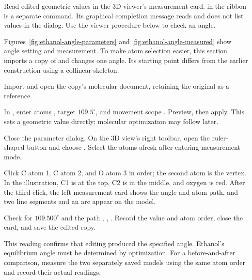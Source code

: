 Read edited geometric values in the 3D viewer's measurement card.  in the ribbon is a separate command. Its graphical completion message reads  and does not list values in the dialog. Use the viewer procedure below to check an angle.

Figures~\ref{fig:ethanol-angle-parameters} and \ref{fig:ethanol-angle-measured} show angle setting and measurement. To make atom selection easier, this section imports a copy of \mbox{} and changes one angle. Its starting point differs from the earlier construction using a collinear skeleton.

\begin{steps}
  \item Import \mbox{} and open the copy's molecular document, retaining the original as a reference.
  \item In , enter atoms , target $109.5^\circ$, and movement scope . Preview, then apply. This sets a geometric value directly; molecular optimization may follow later.
\end{steps}



\begin{steps}[resume]
  \item Close the parameter dialog. On the 3D view's right toolbar, open the ruler-shaped  button and choose . Select the atoms afresh after entering measurement mode.
  \item Click C atom 1, C atom 2, and O atom 3 in order; the second atom is the vertex. In the illustration, C1 is at the top, C2 is in the middle, and oxygen is red. After the third click, the left measurement card shows the angle and atom path, and two line segments and an arc appear on the model.
  \item Check for $109.500^\circ$ and the path , , . Record the value and atom order, close the card, and save the edited copy.
\end{steps}

This reading confirms that editing produced the specified angle. Ethanol's equilibrium angle must be determined by optimization. For a before-and-after comparison, measure the two separately saved models using the same atom order and record their actual readings.

